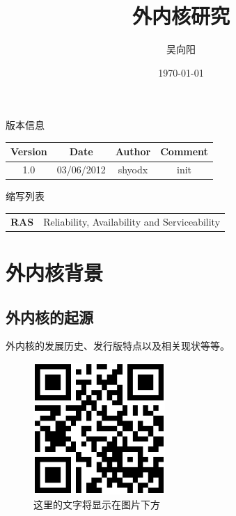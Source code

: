 \documentclass[12pt,openany,a4paper]{report}
\title{外内核研究}
\author{吴向阳}
\date{\today}
\begin{document}
\maketitle %

\newpage
\begin{center}版本信息\end{center}
\begin{center}
\begin{tabular}{| c | c | c | c |}
\hline
Version & Date & Author & Comment \\ \hline
1.0 & 03/06/2012 & shyodx & init \\ \hline
\end{tabular}
\end{center}

\newpage
\begin{center}缩写列表\end{center}
\begin{tabular}{l l}
\textbf{RAS} & Reliability, Availability and Serviceability \\
\end{tabular}

\tableofcontents %
\listoffigures %
\listoftables %
\clearpage

\newpage

\chapter{外内核背景}
	\section{外内核的起源}
	外内核的发展历史、发行版特点以及相关现状等等。

	\begin{figure}[htb]
		\centering
		\includegraphics[height=5cm]{gmail.eps}
		\caption[这里的文字将显示在 list of figures 里]{这里的文字将显示在图片下方}
	\end{figure}
\end{document}
